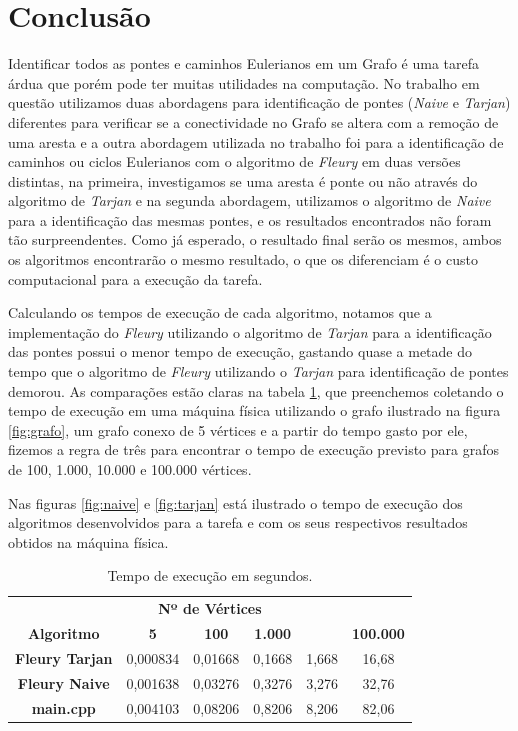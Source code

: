 \newpage
\section{Conclusão}
\label{Conclusao}
Identificar todos as pontes e caminhos Eulerianos em um Grafo é uma tarefa árdua que porém pode ter muitas utilidades na computação. No trabalho em questão utilizamos duas abordagens para identificação de pontes (\textit{Naive} e \textit{Tarjan}) diferentes para verificar se a conectividade no Grafo se altera com a remoção de uma aresta e a outra abordagem utilizada no trabalho foi para a identificação de caminhos ou ciclos Eulerianos com o algoritmo de \textit{Fleury} em duas versões distintas, na primeira, investigamos se uma aresta é ponte ou não através do algoritmo de \textit{Tarjan} e na segunda abordagem, utilizamos o algoritmo de \textit{Naive} para a identificação das mesmas pontes, e os resultados encontrados não foram tão surpreendentes. Como já esperado, o resultado final serão os mesmos, ambos os algoritmos encontrarão o mesmo resultado, o que os diferenciam é o custo computacional para a execução da tarefa. 

Calculando os tempos de execução de cada algoritmo, notamos que a implementação do \textit{Fleury} utilizando o algoritmo de \textit{Tarjan} para a identificação das pontes possui o menor tempo de execução, gastando quase a metade do tempo que o algoritmo de \textit{Fleury} utilizando o \textit{Tarjan} para identificação de pontes demorou. As comparações estão claras na tabela \ref{tab:compare}, que preenchemos coletando o tempo de execução em uma máquina física utilizando o grafo ilustrado na figura \ref{fig:grafo}, um grafo conexo de 5 vértices e a partir do tempo gasto por ele, fizemos a regra de três para encontrar o tempo de execução previsto para grafos de 100, 1.000, 10.000 e 100.000 vértices.

Nas figuras \ref{fig:naive} e \ref{fig:tarjan} está ilustrado o tempo de execução dos algoritmos desenvolvidos para a tarefa e com os seus respectivos resultados obtidos na máquina física.



   \begin{table}
         \centering
	\begin{tabular}{|c|c c c c c |} 
	\hline
	\multicolumn{6}{|c|}{\textbf{Nº de Vértices}} \\ 
	\textbf{Algoritmo} & \textbf{5} & \textbf{100} & \textbf{1.000} & \texbf{10.000} & \textbf{100.000} \\
		\hline \textbf{	Fleury Tarjan } & 0,000834 & 0,01668 & 0,1668 & 1,668 & 16,68   \\ 
		\hline \textbf{ Fleury Naive } & 0,001638 & 0,03276 & 0,3276 & 3,276 & 32,76   \\ 
		\hline \textbf{	main.cpp } & 0,004103 & 0,08206 & 0,8206 & 8,206 & 82,06   \\ 
 		\hline
	\end{tabular}
    \caption{Tempo de execução em segundos.}
    \label{tab:compare}
   \end{table}

